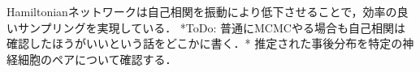 Hamiltonianネットワークは自己相関を振動により低下させることで，効率の良いサンプリングを実現している．
*ToDo: 普通にMCMCやる場合も自己相関は確認したほうがいいという話をどこかに書く．*
推定された事後分布を特定の神経細胞のペアについて確認する．